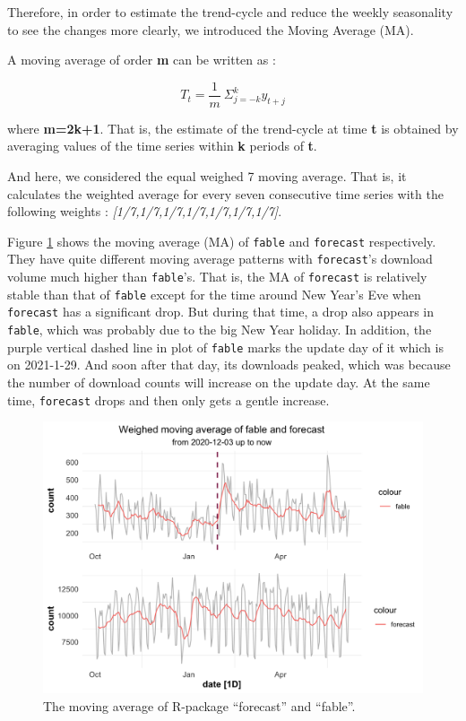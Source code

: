 \documentclass[
]{book}
\begin{document}
Therefore, in order to estimate the trend-cycle and reduce the weekly seasonality to see the changes more clearly, we introduced the Moving Average (MA).

A moving average of order \textbf{m} can be written as :

\[T_t = \frac1m\ \Sigma_{j = -k}^{k}y_{t+j} \]

where \textbf{m=2k+1}. That is, the estimate of the trend-cycle at time \textbf{t} is obtained by averaging values of the time series within \textbf{k} periods of \textbf{t}.

And here, we considered the equal weighed 7 moving average. That is, it calculates the weighted average for every seven consecutive time series with the following weights : \emph{{[}1/7,1/7,1/7,1/7,1/7,1/7,1/7{]}}.

Figure \ref{fig:ff-ma} shows the moving average (MA) of \texttt{fable} and \texttt{forecast} respectively. They have quite different moving average patterns with \texttt{forecast}'s download volume much higher than \texttt{fable}'s. That is, the MA of \texttt{forecast} is relatively stable than that of \texttt{fable} except for the time around New Year's Eve when \texttt{forecast} has a significant drop. But during that time, a drop also appears in \texttt{fable}, which was probably due to the big New Year holiday. In addition, the purple vertical dashed line in plot of \texttt{fable} marks the update day of it which is on 2021-1-29. And soon after that day, its downloads peaked, which was because the number of download counts will increase on the update day. At the same time, \texttt{forecast} drops and then only gets a gentle increase.



\begin{figure}

{\centering \includegraphics{figures/ff-ma-1} 

}

\caption{The moving average of R-package ``forecast'' and ``fable''.}\label{fig:ff-ma}
\end{figure}
\end{document}
